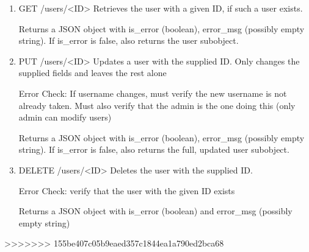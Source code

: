 \documentclass[12pt]{article}
\begin{document}
\begin{enumerate}
\item GET /users/<ID>
Retrieves the user with a given ID, if such a user exists. 

Returns a JSON object with is\_error (boolean), error\_msg (possibly empty string). If is\_error is false, also returns the user subobject. 

\item PUT /users/<ID>
Updates a user with the supplied ID. Only changes the supplied fields and leaves the rest alone

Error Check: If username changes, must verify the new username is not already taken. Must also verify that the admin is the one doing this (only admin can modify users)

Returns a JSON object with is\_error (boolean), error\_msg (possibly empty string). If is\_error is false, also returns the full, updated user subobject. 

\item DELETE /users/<ID>
Deletes the user with the supplied ID. 

Error Check: verify that the user with the given ID exists

Returns a JSON object with is\_error (boolean) and error\_msg (possibly empty string)
\end{enumerate}

>>>>>>> 155be407c05b9eaed357c1844ea1a790ed2bca68
\end{document}
